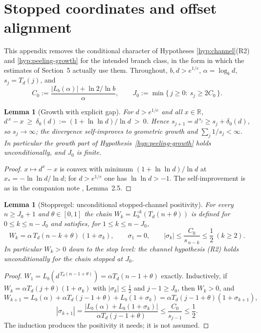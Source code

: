 \documentclass[11pt,a4paper]{article}
\theoremstyle{plain}
\newtheorem{lemma}[theorem]{Lemma}
\theoremstyle{definition}
\theoremstyle{remark}
\newcommand{\R}{\mathbb{R}}
\begin{document}
\section{Stopped coordinates and offset alignment}\label{app:stopped}

This appendix removes the conditional character of Hypotheses
\ref{hyp:channel}(R2) and \ref{hyp:peeling-growth} for the intended branch
class, in the form in which the estimates of Section~5 actually use them.
Throughout, $b,d>e^{1/e}$, $\alpha=\log_b d$, $s_j=T_d(j)$, and
\[
  C_0:=\frac{|L_b(\alpha)|+\ln 2/\ln b}{\alpha},
  \qquad
  J_0:=\min\{\,j\ge0:\ s_j\ge 2C_0\,\}.
\]

\begin{lemma}[Growth with explicit gap]\label{lem:D-growth}
For $d>e^{1/e}$ and all $x\in\R$,
$d^{\,x}-x\ \ge\ \delta_0(d):=(1+\ln\ln d)/\ln d\ >\ 0$.
Hence $s_{j+1}=d^{\,s_j}\ge s_j+\delta_0(d)$, so $s_j\to\infty$;
the divergence self-improves to geometric growth and
$\sum_j 1/s_j<\infty$.  In particular the growth part of
Hypothesis~\ref{hyp:peeling-growth} holds unconditionally, and $J_0$ is
finite.
\end{lemma}

\begin{proof}
$x\mapsto d^x-x$ is convex with minimum $(1+\ln\ln d)/\ln d$ at
$x_*=-\ln\ln d/\ln d$; for $d>e^{1/e}$ one has $\ln\ln d>-1$.  The
self-improvement is as in the companion note \cite{justus-diffeo-note},
Lemma~2.5.
\end{proof}

\begin{lemma}[Stoppregel: unconditional stopped-channel positivity]
\label{lem:D-stop}
For every $n\ge J_0+1$ and $\theta\in[0,1]$ the chain
$W_k=L_b^{\circ k}(T_d(n+\theta))$ is defined for $0\le k\le n-J_0$ and
satisfies, for $1\le k\le n-J_0$,
\[
  W_k=\alpha\,T_d(n-k+\theta)\,(1+\sigma_k),\qquad
  \sigma_1=0,\qquad
  |\sigma_k|\le\frac{C_0}{s_{\,n-k}}\le\frac12\ (k\ge2).
\]
In particular $W_k>0$ down to the stop level: the channel hypothesis (R2)
holds unconditionally for the chain stopped at $J_0$.
\end{lemma}

\begin{proof}
$W_1=L_b(d^{\,T_d(n-1+\theta)})=\alpha T_d(n-1+\theta)$ exactly.
Inductively, if $W_k=\alpha T_d(j+\theta)(1+\sigma_k)$ with
$|\sigma_k|\le\tfrac12$ and $j-1\ge J_0$, then $W_k>0$, and
\[
  W_{k+1}=L_b(\alpha)+\alpha T_d(j-1+\theta)+L_b(1+\sigma_k)
         =\alpha T_d(j-1+\theta)(1+\sigma_{k+1}),
\]
\[
  |\sigma_{k+1}|
  =\frac{|L_b(\alpha)+L_b(1+\sigma_k)|}{\alpha T_d(j-1+\theta)}
  \le\frac{C_0}{s_{j-1}}\le\frac12 .
\]
The induction produces the positivity it needs; it is not assumed.
\end{proof}
\end{document}
